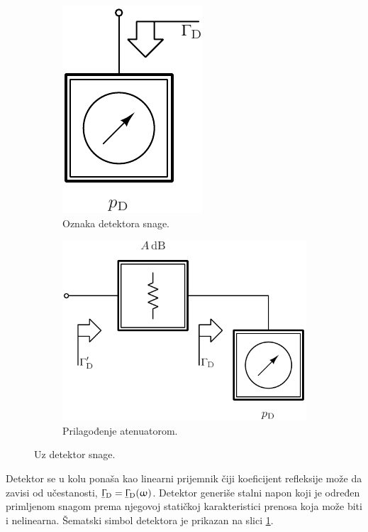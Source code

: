 \documentclass[a4paper, 12pt, diplomski]{etf}
\newcommand{\faz}[1]{\underaccent{\bar}{#1}}
\begin{document}
\begin{figure}[b!]
    \hfill
    \begin{subfigure}[b]{0.39\textwidth}
        \centering
        \includegraphics[scale=0.83]{fig/rfd.pdf}
        \caption{Oznaka detektora snage.}
        \label{fig:rfd}
    \end{subfigure}
    \hfill
    \begin{subfigure}[b]{0.59\textwidth}
        \centering
        \includegraphics[scale=0.83]{fig/rfd_att.pdf}
        \caption{Prilagođenje atenuatorom.}
        \label{fig:rfd_att}
    \end{subfigure}
    \hfill
    \caption{Uz detektor snage.}
\end{figure}
%
Detektor se u kolu ponaša kao linearni prijemnik čiji 
koeficijent refleksije 
može da zavisi od učestanosti, 
$\faz \Upgamma_{\rm D} = \faz \Upgamma_{\rm D} (\upomega)$. 
Detektor generiše stalni napon koji je određen primljenom snagom prema njegovoj
statičkoj karakteristici prenosa koja može biti i
nelinearna. 
Šematski simbol detektora je prikazan na slici 
\ref{fig:rfd}. 
\end{document}
